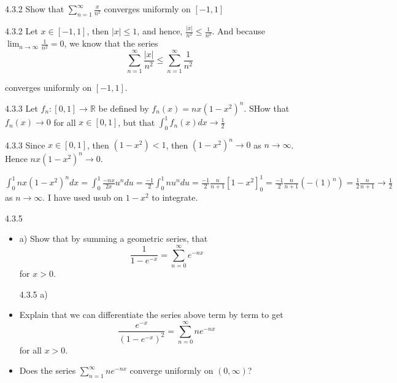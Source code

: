\documentclass[a4paper,norsk]{article}
\renewcommand{\leq}{\leqslant}
\begin{document}
\begin{oppgavebox}{4.3.2}{}
Show that $ \sum_{n=1}^{\infty} \frac{ x }{ n^2 }   $ converges uniformly on $ \left[ -1, 1 \right]  $

\begin{proofbox}{4.3.2}{}
  Let $ x \in \left[ -1, 1 \right]  $, then $ \left| x \right| \leq  1 $, and hence, $ \frac{ \left| x \right| }{ n^2 } \leq  \frac{ 1 }{ n^2 }  $. And because $ \lim_{n \to \infty} \frac{ 1 }{ n^ 2 }  =0$, we know that the series
  \[
      \sum_{n=1}^{\infty} \frac{ \left| x \right|  }{ n^2 } \leq  \sum_{n=1}^{\infty} \frac{ 1 }{ n^2 }   
  \]

  converges uniformly on $ \left[ -1, 1 \right]  $. 
      
\end{proofbox}
\end{oppgavebox}


\begin{oppgavebox}{4.3.3}{}
Let $ f_n : \left[ 0, 1 \right] \to \mathbb{R}  $ be defined by $ f_n(x) = nx \left( 1-x^2 \right)^n  $. SHow that $ f_n(x) \to  0$ for all $ x \in \left[ 0, 1 \right]  $, but that $ \int_{0}^{1} f_n(x) dx \to \frac{ 1 }{ 2 }  $

\begin{proofbox}{4.3.3}{}
  Since $ x \in  \left[ 0, 1 \right]  $, then $ \left( 1-x^2 \right) < 1 $, then $ \left( 1- x^2 \right)^n \to 0 $ as $ n \to \infty $. Hence $ nx \left( 1-x^2 \right) ^n \to 0 $.
  
  
  $ \int_{0}^{1} nx \left( 1-x^2 \right) ^n dx = \int_{0}^{1} \frac{ -nx }{ 2x } u^n du  = \frac{ -1 }{ 2 } \int_{0}^{1} n u^n du = \frac{ -1 }{ 2 } \frac{ n }{ n+1 } \left[ 1-x^2 \right]_{0}^1 = \frac{ -1 }{ 2 } \frac{ n }{ n+1 } \left( - \left( 1 \right) ^n \right) = \frac{ 1 }{ 2 } \frac{ n }{ n+1 }  \to \frac{ 1 }{ 2 }  $ as $ n \to \infty $. I have used usub on $ 1-x^2 $ to integrate.  
\end{proofbox}
\end{oppgavebox}


\begin{oppgavebox}{4.3.5}{}
\begin{itemize}
  \item a) Show that by summing a geometric series, that 
  \[
      \frac{ 1}{ 1 - e^{-x} } = \sum_{n=0}^{\infty} e^{-nx}      
  \]
  for $ x > 0 $.

  \begin{proofbox}{4.3.5 a)}{}
    
  \end{proofbox}
  \item Explain that we can differentiate the series above term by term to get 
  \[
      \frac{ e^{-x} }{ \left( 1 - e^{-x} \right)^2  } = \sum_{n=0}^{\infty} n e^{-nx}      
  \]
  for all $ x > 0 $.
  \item Does the series $ \sum_{n=1}^{\infty} ne^{-nx}   $ converge uniformly on $ \left( 0, \infty \right)  $? 
\end{itemize}
\end{oppgavebox}
\end{document}

